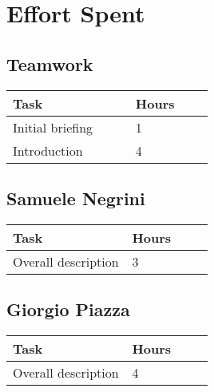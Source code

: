 \chapter{Effort Spent}

\section{Teamwork}
\vspace{2mm}
\begin{center}
    \begin{tabular}{@{}p{0.3\linewidth} p{0.2\linewidth}@{}}
        \hline
        \textbf{Task} & \textbf{Hours} \\ \hline
        Initial briefing & 1 \\ \hline
        Introduction & 4 \\ \hline
    \end{tabular}
\end{center}

\section{Samuele Negrini}
\vspace{2mm}
\begin{center}
	\begin{tabular}{@{}p{0.3\linewidth} p{0.2\linewidth}@{}}
		\hline
		\textbf{Task} & \textbf{Hours} \\ \hline
		Overall description & 3 \\ \hline
	\end{tabular}
\end{center}

\section{Giorgio Piazza}
\vspace{2mm}
\begin{center}
	\begin{tabular}{@{}p{0.3\linewidth} p{0.2\linewidth}@{}}
		\hline
		\textbf{Task} & \textbf{Hours} \\ \hline
		Overall description & 4 \\ \hline
	\end{tabular}
\end{center}